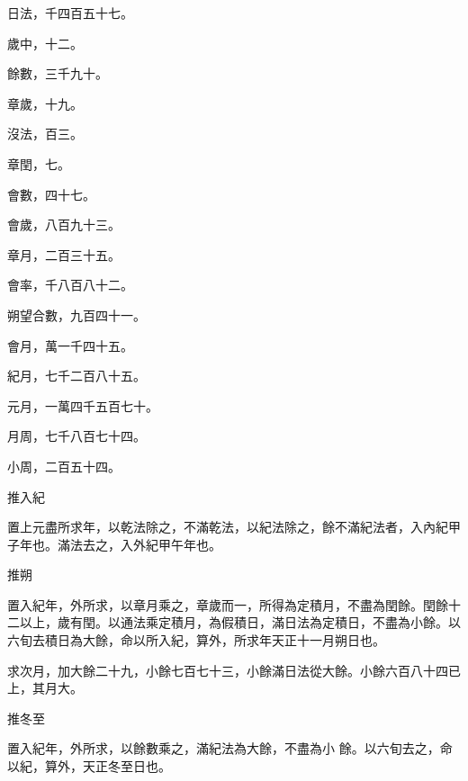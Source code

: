 \begin{pinyinscope}
 日法，千四百五十七。



 歲中，十二。



 餘數，三千九十。



 章歲，十九。



 沒法，百三。



 章閏，七。



 會數，四十七。



 會歲，八百九十三。



 章月，二百三十五。



 會率，千八百八十二。



 朔望合數，九百四十一。



 會月，萬一千四十五。



 紀月，七千二百八十五。



 元月，一萬四千五百七十。



 月周，七千八百七十四。



 小周，二百五十四。



 推入紀



 置上元盡所求年，以乾法除之，不滿乾法，以紀法除之，餘不滿紀法者，入內紀甲子年也。滿法去之，入外紀甲午年也。



 推朔



 置入紀年，外所求，以章月乘之，章歲而一，所得為定積月，不盡為閏餘。閏餘十二以上，歲有閏。以通法乘定積月，為假積日，滿日法為定積日，不盡為小餘。以六旬去積日為大餘，命以所入紀，算外，所求年天正十一月朔日也。



 求次月，加大餘二十九，小餘七百七十三，小餘滿日法從大餘。小餘六百八十四已上，其月大。



 推冬至



 置入紀年，外所求，以餘數乘之，滿紀法為大餘，不盡為小
 餘。以六旬去之，命以紀，算外，天正冬至日也。




\end{pinyinscope}
